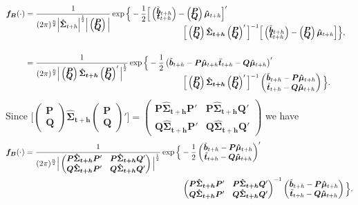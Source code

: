 \documentclass[a4paper, 11pt]{article}
\def\PQ{\begin{pmatrix}\bm{P}\\[-0.2cm]\bm{Q}\end{pmatrix}}
\def\bt{\begin{pmatrix}\tilde{\bm{b}}_{t+h}\\[-0.2cm]\tilde{\bm{t}}_{t+h}\end{pmatrix}}
\begin{document}
\begin{align*}
\bm{f_B}(\cdot)& =\frac{1}{(2\pi)^{\frac{n}{2}}\Big|\bm{\hat{\Sigma}}_{t+h}\Big|^{\frac{1}{2}}\Big|\PQ \Big|}
\exp \Big\{-\frac{1}{2}\Big[\bt-\PQ\bm{\hat{\mu}}_{t+h}\Big]'\\[-0.5cm]
& \hspace*{7cm}
\Big[\PQ\bm{\hat{\Sigma}_{t+h}}\PQ'\Big]^{-1}\Big[\bt-\PQ\bm{\hat{\mu}}_{t+h}\Big] \Big\},\\[0.5cm]
 & =\frac{1}{(2\pi)^{\frac{n}{2}}\Big|\PQ\bm{\hat{\Sigma}_{t+h}}\PQ'\Big|^{\frac{1}{2}}}
\exp \Big\{-\frac{1}{2} \begin{pmatrix}\tilde{\bm{b}}_{t+h} - \bm{P}\bm{\hat{\mu}}_{t+h} \tilde{\bm{t}}_{t+h}- \bm{Q}\bm{\hat{\mu}}_{t+h}\end{pmatrix}' &\\[-0.5cm]
& \hspace*{7cm}
 \Big[\PQ\bm{\hat{\Sigma}_{t+h}}\PQ'\Big]^{-1}\begin{pmatrix}\tilde{\bm{b}}_{t+h} - \bm{P}\bm{\hat{\mu}}_{t+h}\\ \tilde{\bm{t}}_{t+h}- \bm{Q}\bm{\hat{\mu}}_{t+h}\end{pmatrix} \Big\}.
\end{align*}
Since $\Big[\PQ\bm{\hat{\Sigma}_{t+h}}\PQ'\Big] = \begin{pmatrix}
\bm{P}\bm{\hat{\Sigma}_{t+h}}\bm{P}' & \bm{P}\bm{\hat{\Sigma}_{t+h}}\bm{Q}' \\
\bm{Q}\bm{\hat{\Sigma}_{t+h}}\bm{P}' & \bm{Q}\bm{\hat{\Sigma}_{t+h}}\bm{Q}'
\end{pmatrix}$ we have
\begin{align*}
\bm{f_B}(\cdot)&=\frac{1}{(2\pi)^{\frac{n}{2}}\Big|\begin{pmatrix}
  \bm{P}\bm{\hat{\Sigma}_{t+h}}\bm{P}' & \bm{P}\bm{\hat{\Sigma}_{t+h}}\bm{Q}' \\
  \bm{Q}\bm{\hat{\Sigma}_{t+h}}\bm{P}' & \bm{Q}\bm{\hat{\Sigma}_{t+h}}\bm{Q}'
  \end{pmatrix}\Big|^{\frac{1}{2}}}
\exp \Big\{-\frac{1}{2} \begin{pmatrix}\tilde{\bm{b}}_{t+h} - \bm{P}\bm{\hat{\mu}}_{t+h}\\ \tilde{\bm{t}}_{t+h}- \bm{Q}\bm{\hat{\mu}}_{t+h}\end{pmatrix}'\\
&\hspace*{7cm}\begin{pmatrix}
\bm{P}\bm{\hat{\Sigma}_{t+h}}\bm{P}' & \bm{P}\bm{\hat{\Sigma}_{t+h}}\bm{Q}' \\
\bm{Q}\bm{\hat{\Sigma}_{t+h}}\bm{P}' & \bm{Q}\bm{\hat{\Sigma}_{t+h}}\bm{Q}'
\end{pmatrix}^{-1}
\begin{pmatrix}\tilde{\bm{b}}_{t+h} - \bm{P}\bm{\hat{\mu}}_{t+h}\\ \tilde{\bm{t}}_{t+h}- \bm{Q}\bm{\hat{\mu}}_{t+h}\end{pmatrix} \Big\}.
\end{align*}
\end{document}
